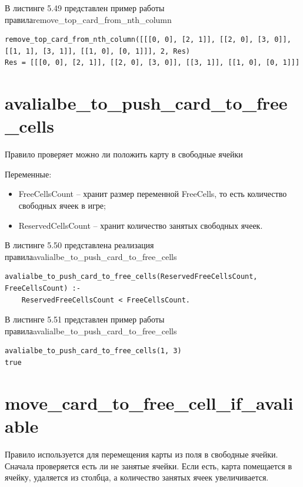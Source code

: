 \documentclass[12pt]{report}
\begin{document}
В листинге 5.49 представлен пример работы правила\newline remove\_top\_card\_from\_nth\_column

\begin{lstlisting}[label=some-code, caption=пример работы правила remove\_top\_card\_from\_nth\_column]
remove_top_card_from_nth_column([[[0, 0], [2, 1]], [[2, 0], [3, 0]], [[1, 1], [3, 1]], [[1, 0], [0, 1]]], 2, Res)
Res = [[[0, 0], [2, 1]], [[2, 0], [3, 0]], [[3, 1]], [[1, 0], [0, 1]]]
\end{lstlisting}

\section{avalialbe\_to\_push\_card\_to\_free\_cells}
Правило проверяет можно ли положить карту в свободные ячейки

Переменные:
\begin{itemize}
\item FreeCellsCount – хранит размер переменной FreeCells, то есть количество свободных ячеек в игре;
\item ReservedCellsCount – хранит количество занятых свободных ячеек.
\end{itemize}

В листинге 5.50 представлена реализация правила\newline avalialbe\_to\_push\_card\_to\_free\_cells

\begin{lstlisting}[label=some-code, caption=реализация правила avalialbe\_to\_push\_card\_to\_free\_cells]
avalialbe_to_push_card_to_free_cells(ReservedFreeCellsCount, FreeCellsCount) :- 
    ReservedFreeCellsCount < FreeCellsCount.
\end{lstlisting}
В листинге 5.51 представлен пример работы правила\newline avalialbe\_to\_push\_card\_to\_free\_cells

\begin{lstlisting}[label=some-code, caption=пример работы правила avalialbe\_to\_push\_card\_to\_free\_cells]
avalialbe_to_push_card_to_free_cells(1, 3)
true
\end{lstlisting}

\section{move\_card\_to\_free\_cell\_if\_avaliable}
Правило используется для перемещения карты из поля в свободные ячейки. Сначала проверяется есть ли не занятые ячейки. Если есть, карта помещается в ячейку, удаляется из столбца, а количество занятых ячеек увеличивается.
\end{document}
